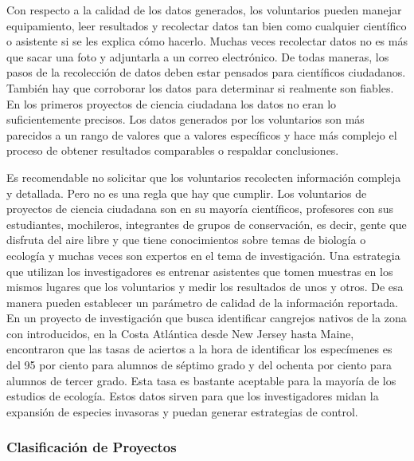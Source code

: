 Con respecto a la calidad de los datos generados, los voluntarios pueden manejar equipamiento, leer resultados y recolectar datos tan bien como cualquier científico o asistente si se les explica cómo hacerlo. Muchas veces recolectar datos no es más que sacar una foto y adjuntarla a un correo electrónico. De todas maneras, los pasos de la recolección de datos deben estar pensados para científicos ciudadanos. También hay que corroborar los datos para determinar si realmente son fiables. En los primeros proyectos de ciencia ciudadana los datos no eran lo suficientemente precisos. Los datos generados por los voluntarios son más parecidos a un rango de valores que a valores específicos y hace más complejo el proceso de obtener resultados comparables o respaldar conclusiones. 

Es recomendable no solicitar que los voluntarios recolecten información compleja y detallada. Pero no es una regla que hay que cumplir. Los voluntarios de proyectos de ciencia ciudadana son en su mayoría científicos, profesores con sus estudiantes, mochileros, integrantes de grupos de conservación, es decir, gente que disfruta del aire libre y que tiene conocimientos sobre temas de biología o ecología y muchas veces son expertos en el tema de investigación. Una estrategia que utilizan los investigadores es entrenar asistentes que tomen muestras en los mismos lugares que los voluntarios y medir los resultados de unos y otros. De esa manera pueden establecer un parámetro de calidad de la información reportada. En un proyecto de investigación que busca identificar cangrejos nativos de la zona con introducidos, en la Costa Atlántica desde New Jersey hasta Maine, encontraron que las tasas de aciertos a la hora de identificar los especímenes es del 95 por ciento para alumnos de séptimo grado y del ochenta por ciento para alumnos de tercer grado. Esta tasa es bastante aceptable para la mayoría de los estudios de ecología. Estos datos sirven para que los investigadores midan la expansión de especies invasoras y puedan generar estrategias de control. \cite{cohn2008citizen}
	

\subsubsection{Clasificación de Proyectos}	


